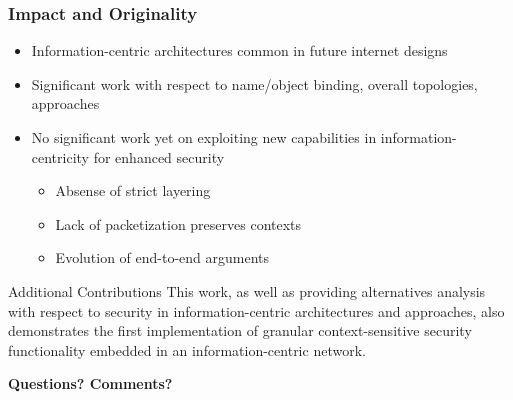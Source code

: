 \documentclass[t,handout]{beamer}
\begin{document}
\begin{frame}
\frametitle{Impact and Originality}
\begin{itemize}
\item Information-centric architectures common in future internet designs
\item Significant work with respect to name/object binding, overall topologies, approaches
\item No significant work yet on exploiting new capabilities in information-centricity for enhanced security
\begin{itemize}
\item {\small Absense of strict layering}
\item {\small Lack of packetization preserves contexts} 
\item {\small Evolution of end-to-end arguments}
\end{itemize}
\end{itemize}
\begin{beamerboxesrounded}[shadow]{Additional Contributions}
{\small This work, as well as providing alternatives analysis with respect to security in information-centric architectures and approaches, also demonstrates the first implementation of granular context-sensitive security functionality embedded in an information-centric network.}
\end{beamerboxesrounded}
\end{frame}



\begin{frame}[c]
\begin{center}
\textbf{Questions? Comments?}
\end{center}
\end{frame}

%
\end{document}
